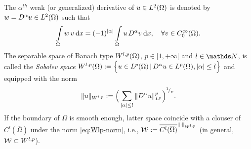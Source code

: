 \noindent
The $\alpha^{th}$ weak (or generalized) derivative of $u \in L^{2}(\Omega)$ is 
denoted by \linebreak
$w = D^\alpha u \in L^{2}(\Omega)$ such that
%
\begin{equation*}
	\Int_\Omega w \, v \dx = (-1)^{|\alpha|} \Int_\Omega u \, D^\alpha v \dx, 
	\quad \forall v \in C^{\infty}_{0}(\Omega).
\end{equation*}
%
The separable space of Banach type 
$W^{l, p}_{} (\Omega)$, $p \in [1, +\infty[$ and $l \in \Nd$,
is called the {\em Sobolev space} 
%
$W^{l, p}_{} (\Omega) 
	:= \Big\{ u \in L^{p}(\Omega) \, | \,  D^\alpha u \in L^{p}(\Omega), 
						|\alpha| \leq l \Big\}$
%
and equipped with the norm
%
\begin{equation}
	\| u\|_{\W{l, p}{}} 
	:= \Big( \Sum_{|\alpha| \leq l } \| D^\alpha u \|^p_{\L{p}} \Big)^{\rfrac{1}{p}}. 
	\label{eq:Wlp-norm}
\end{equation}
%
If the boundary of $\Omega$ is smooth enough, 
latter space coincide with a clouser of $C^{l}(\overline{\Omega})$ 
under the norm \eqref{eq:Wlp-norm}, i.e., 
$\mathcal{W} : = \overline{C^{l}(\overline{\Omega})}^{\| \cdot \|_{W^{l, p}_{}}}$  
(in general, $\mathcal{W} \subset W^{l, p}_{}$).

